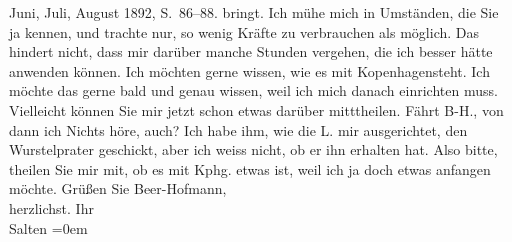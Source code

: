 \begin{ledgroupsized}[t]{13cm}
{{{                        Juni, Juli, August 1892, S. 86–88.}}}\label{K_L03158-1h} bringt. Ich
               mühe mich in Umständen, die Sie ja kennen, und trachte nur, so wenig Kräfte zu
               verbrauchen als möglich. Das hindert nicht, dass mir darüber manche Stunden vergehen,
               die ich besser hätte anwenden können. \pend
           \pstart
           Ich möchten gerne wissen, wie es mit Kopenhagensteht. Ich möchte das gerne
               bald und genau wissen, weil ich mich danach einrichten muss. Vielleicht können Sie
               mir jetzt schon etwas darüber mitttheilen. Fährt B-H., von dann ich Nichts höre, auch? \pend
           \pstart
           Ich habe ihm,  wie die L. mir ausgerichtet, den Wurstelprater geschickt, aber ich weiss nicht, ob er {\pb}ihn erhalten hat. Also bitte,
               theilen Sie mir mit, ob es mit Kphg. etwas ist,
               weil ich ja doch etwas anfangen möchte. \pend
           \pstart
           Grüßen Sie Beer-Hofmann, {\\[\baselineskip]}herzlichst.
               Ihr {\\[\baselineskip]}\spacefill\mbox{Salten}\pend
           \leftskip=0em{}
         
         \endnumbering{}\end{ledgroupsized}\begin{anhang}\end{anhang}\newcommand{\dateiname}{L03158}\newcommand{\titel}{Felix Salten an Arthur Schnitzler, 16. 7. [1895]}\newcommand{\editorInnen}{Martin Anton Müller und Laura Untner}
      